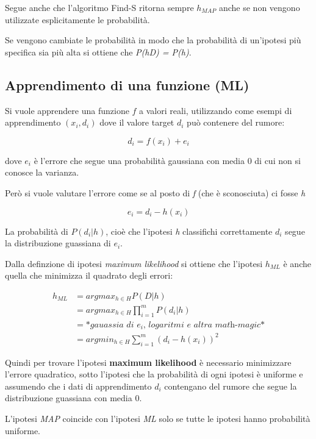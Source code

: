 Segue anche che l'algoritmo Find-S ritorna sempre $h_{MAP}$ anche se non vengono utilizzate esplicitamente le probabilità.

Se vengono cambiate le probabilità in modo che la probabilità di
un'ipotesi più specifica sia più alta si ottiene che
\emph{P(h\textbar{}D) = P(h)}.

\subsection{Apprendimento di una funzione (ML)}\label{apprendimento-di-una-funzione-ml}

Si vuole apprendere una funzione $f$ a valori reali, utilizzando come esempi di apprendimento $(x_i, d_i)$ dove il valore target $d_i$ può contenere del rumore:

$$
d_i = f(x_i) + e_i
$$

dove $e_i$ è l'errore che segue una probabilità gaussiana con media 0 di
cui non si conosce la varianza.

Però si vuole valutare l'errore come se al posto di \emph{f} (che è sconosciuta) ci fosse \emph{h}

$$
e_i = d_i - h(x_i)
$$

La probabilità di $P(d_i | h)$, cioè che l'ipotesi \emph{h}
classifichi correttamente $d_i$ segue la distribuzione guassiana di
$e_i$.

Dalla definzione di ipotesi \textit{maximum likelihood} si ottiene che l'ipotesi $h_{ML}$ è anche quella che minimizza il quadrato degli errori:

\begin{align*}
h_{ML} &= argmax_{h \in H} P(D|h) \\
				&=  argmax_{h \in H} \prod\limits_{i=1}^m P(d_i|h) \\
				&= *\textit{gauassia di } e_i \textit{, logaritmi e altra math-magic*}\\
				&= arg min_{h \in H} \sum\limits_{i = 1}^m (d_i - h(x_i))^2
\end{align*}

Quindi per trovare l'ipotesi \textbf{maximum likelihood} è necessario
minimizzare l'errore quadratico, sotto l'ipotesi che la probabilità di
ogni ipotesi è uniforme e assumendo che i dati di apprendimento $d_i$ contengano del rumore che segue la distribuzione guassiana con media 0.

L'ipotesi \textit{MAP} coincide con l'ipotesi \textit{ML} solo se tutte le ipotesi hanno probabilità uniforme.

